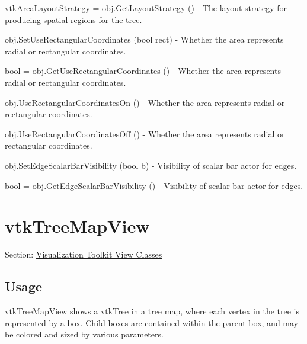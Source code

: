 \begin{DoxyItemize}
\item {\ttfamily vtk\-Area\-Layout\-Strategy = obj.\-Get\-Layout\-Strategy ()} -\/ The layout strategy for producing spatial regions for the tree.  
\item {\ttfamily obj.\-Set\-Use\-Rectangular\-Coordinates (bool rect)} -\/ Whether the area represents radial or rectangular coordinates.  
\item {\ttfamily bool = obj.\-Get\-Use\-Rectangular\-Coordinates ()} -\/ Whether the area represents radial or rectangular coordinates.  
\item {\ttfamily obj.\-Use\-Rectangular\-Coordinates\-On ()} -\/ Whether the area represents radial or rectangular coordinates.  
\item {\ttfamily obj.\-Use\-Rectangular\-Coordinates\-Off ()} -\/ Whether the area represents radial or rectangular coordinates.  
\item {\ttfamily obj.\-Set\-Edge\-Scalar\-Bar\-Visibility (bool b)} -\/ Visibility of scalar bar actor for edges.  
\item {\ttfamily bool = obj.\-Get\-Edge\-Scalar\-Bar\-Visibility ()} -\/ Visibility of scalar bar actor for edges.  
\end{DoxyItemize}\hypertarget{vtkviews_vtktreemapview}{}\section{vtk\-Tree\-Map\-View}\label{vtkviews_vtktreemapview}
Section\-: \hyperlink{sec_vtkviews}{Visualization Toolkit View Classes} \hypertarget{vtkwidgets_vtkxyplotwidget_Usage}{}\subsection{Usage}\label{vtkwidgets_vtkxyplotwidget_Usage}
vtk\-Tree\-Map\-View shows a vtk\-Tree in a tree map, where each vertex in the tree is represented by a box. Child boxes are contained within the parent box, and may be colored and sized by various parameters.

